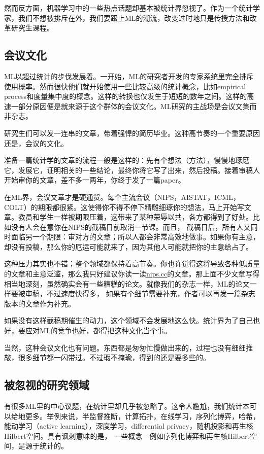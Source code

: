 \documentclass[]{article}
\begin{document}
然而反方面，机器学习中的一些热点话题却基本被统计界忽视了。作为一个统计学家，我们不想被排斥在外，我们要跟上ML的潮流，改变过时地只是传授方法和改革研究生课程。

\subsection{会议文化}

ML以超过统计的步伐发展着。一开始，ML的研究者开发的专家系统里完全排斥使用概率。然而很快他们就开始使用一些比较高级的统计概念，比如empirical process和度量集中度的概念。这样的转换也仅发生于短短的数年之间。这样的高速一部分原因便是就来源于这个群体的会议文化。ML研究的主战场是会议文集而非杂志。

研究生们可以发一连串的文章，带着强悍的简历毕业。这种高节奏的一个重要原因还是，会议的文化。 

准备一篇统计学的文章的流程一般是这样的：先有个想法（方法），慢慢地琢磨它，发展它，证明相关的一些结论，最终你将它写了出来，然后投稿。接着审稿人开始审你的文章，差不多一两年，你终于发了一篇paper。

在ML界，会议文章才是硬通货。每个主流会议（NIPS，AISTAT，ICML，COLT）的期限都很紧。这使得你不得不停下精雕细琢你的想法，马上开始写文章。教员和学生一样被期限压着，这带来了某种荣辱以共，各方都得到了好处。比如没有人会在意你在NIPS的截稿日前取消一节课。而且，
截稿日后，所有人又同时面临另一个期限：审对方的文章；所以人都会非常高效地做事。如果你有主意，却没有投稿，那么你的厄运可能就来了，因为其他人可能就把你的主意给占了。

这种压力其实也不错；整个领域都保持着高节奏。你也许觉得这将导致各种低质量的文章和主意泛滥，那么我只好建议你读一读\url{nips.cc}的文章。那上面不少文章写得相当地深刻，虽然确实会有一些糟糕的论文。就像我们的杂志一样，ML的论文一样要被审稿，不过速度快得多，
如果有个细节需要补充，作者可以再发一篇杂志版本的文章作为补充。

如果没有这样截稿期催生的动力，这个领域不会发展地这么快。统计界为了自己也好，要应对ML的竞争也好，都得把这种文化当个事。

当然，这种会议文化也有问题。东西都是匆匆忙慢做出来的，过程也没有细细推敲，很多细节都一闪带过。不过瑕不掩瑜，得到的还是要多些的。

\subsection{被忽视的研究领域}

有很多ML里的中心议题，在统计里却几乎被忽略了。这令人尴尬，我们统计本可以给地更多。举例来说，半监督推断，计算拓扑，在线学习，序列化博弈，哈希，能动学习（active learning），深度学习，differential privacy，随机投影和再生核Hilbert空间。具有讽刺意味的是，
一些概念---例如序列化博弈和再生核Hilbert空间，是源于统计的。
\end{document}
